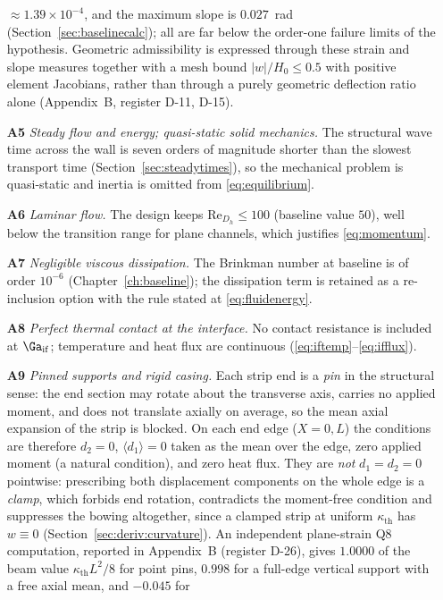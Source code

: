\begin{itemize}
$\approx1.39\times10^{-4}$, and the maximum slope is $0.027$~rad
(Section~\ref{sec:baselinecalc}); all are far below the order-one failure limits of the
hypothesis. Geometric admissibility is expressed through these strain and slope measures together
with a mesh bound $|w|/H_0\le0.5$ with positive element Jacobians, rather than through a purely
geometric deflection ratio alone (Appendix~B, register D-11, D-15).
\item[\textbf{A5}] \emph{Steady flow and energy; quasi-static solid mechanics.} The structural wave
time across the wall is seven orders of magnitude shorter than the slowest transport time
(Section~\ref{sec:steadytimes}), so the mechanical problem is quasi-static and inertia is omitted
from \eqref{eq:equilibrium}.
\item[\textbf{A6}] \emph{Laminar flow.} The design keeps $\mathrm{Re}_{D_h}\le100$ (baseline value $50$),
well below the transition range for plane channels, which justifies \eqref{eq:momentum}.
\item[\textbf{A7}] \emph{Negligible viscous dissipation.} The Brinkman number at baseline is of order
$10^{-6}$ (Chapter~\ref{ch:baseline}); the dissipation term is retained as a re-inclusion option
with the rule stated at \eqref{eq:fluidenergy}.
\item[\textbf{A8}] \emph{Perfect thermal contact at the interface.} No contact resistance is included at
$\Ga_{\mathrm{if}}$; temperature and heat flux are continuous
(\eqref{eq:iftemp}--\eqref{eq:ifflux}).
\item[\textbf{A9}] \emph{Pinned supports and rigid casing.} Each strip end is a \emph{pin} in the
structural sense: the end section may rotate about the transverse axis, carries no applied moment,
and does not translate axially on average, so the mean axial expansion of the strip is blocked.
On each end edge ($X=0,L$) the conditions are therefore $d_2=0$, $\langle d_1\rangle=0$ taken as the
mean over the edge, zero applied moment (a natural condition), and zero heat flux. They are
\emph{not} $d_1=d_2=0$ pointwise: prescribing both displacement components on the whole edge is a
\emph{clamp}, which forbids end rotation, contradicts the moment-free condition and suppresses the
bowing altogether, since a clamped strip at uniform $\kappa_{\mathrm{th}}$ has $w\equiv0$
(Section~\ref{sec:deriv:curvature}). An independent plane-strain Q8 computation, reported in
Appendix~B (register D-26), gives $1.0000$ of the beam value $\kappa_{\mathrm{th}}L^2/8$ for point
pins, $0.998$ for a full-edge vertical support with a free axial mean, and $-0.045$ for

\end{itemize}
